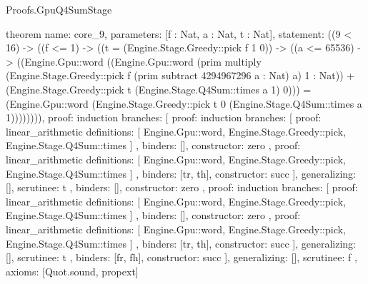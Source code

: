\begin{lexlean}{Proofs.GpuQ4SumStage}
\begin{semanticmodule}
theorem{
  name: core_9,
  parameters: [f : Nat, a : Nat, t : Nat],
  statement: ((9 < 16) -> ((f <= 1) -> ((t = (Engine.Stage.Greedy::pick f 1 0)) -> ((a <= 65536) -> ((Engine.Gpu::word ((Engine.Gpu::word (prim multiply (Engine.Stage.Greedy::pick f (prim subtract 4294967296 a : Nat) a) 1 : Nat)) + (Engine.Stage.Greedy::pick t (Engine.Stage.Q4Sum::times a 1) 0))) = (Engine.Gpu::word (Engine.Stage.Greedy::pick t 0 (Engine.Stage.Q4Sum::times a 1)))))))),
  proof: induction{
    branches: [
      {
        proof: induction{
          branches: [
            {
              proof: linear_arithmetic{
                definitions: [
                  Engine.Gpu::word,
                  Engine.Stage.Greedy::pick,
                  Engine.Stage.Q4Sum::times
                ]
              },
              binders: [],
              constructor: zero
            },
            {
              proof: linear_arithmetic{
                definitions: [
                  Engine.Gpu::word,
                  Engine.Stage.Greedy::pick,
                  Engine.Stage.Q4Sum::times
                ]
              },
              binders: [tr, th],
              constructor: succ
            }
          ],
          generalizing: [],
          scrutinee: t
        },
        binders: [],
        constructor: zero
      },
      {
        proof: induction{
          branches: [
            {
              proof: linear_arithmetic{
                definitions: [
                  Engine.Gpu::word,
                  Engine.Stage.Greedy::pick,
                  Engine.Stage.Q4Sum::times
                ]
              },
              binders: [],
              constructor: zero
            },
            {
              proof: linear_arithmetic{
                definitions: [
                  Engine.Gpu::word,
                  Engine.Stage.Greedy::pick,
                  Engine.Stage.Q4Sum::times
                ]
              },
              binders: [tr, th],
              constructor: succ
            }
          ],
          generalizing: [],
          scrutinee: t
        },
        binders: [fr, fh],
        constructor: succ
      }
    ],
    generalizing: [],
    scrutinee: f
  },
  axioms: [Quot.sound, propext]
}


\end{semanticmodule}
\end{lexlean}
